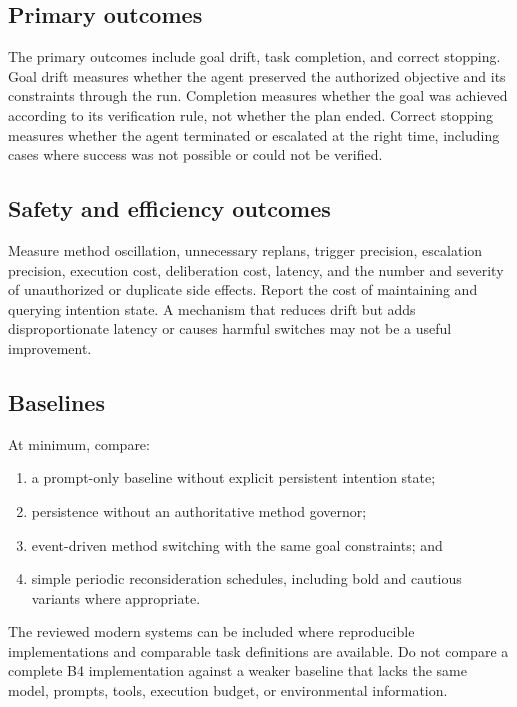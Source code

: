 \subsection{Primary outcomes}

The primary outcomes include goal drift, task completion, and correct stopping. Goal drift measures whether the agent preserved the authorized objective and its constraints through the run. Completion measures whether the goal was achieved according to its verification rule, not whether the plan ended. Correct stopping measures whether the agent terminated or escalated at the right time, including cases where success was not possible or could not be verified.

\subsection{Safety and efficiency outcomes}

Measure method oscillation, unnecessary replans, trigger precision, escalation precision, execution cost, deliberation cost, latency, and the number and severity of unauthorized or duplicate side effects. Report the cost of maintaining and querying intention state. A mechanism that reduces drift but adds disproportionate latency or causes harmful switches may not be a useful improvement.

\subsection{Baselines}

At minimum, compare:

\begin{enumerate}
  \item a prompt-only baseline without explicit persistent intention state;
  \item persistence without an authoritative method governor;
  \item event-driven method switching with the same goal constraints; and
  \item simple periodic reconsideration schedules, including bold and cautious variants where appropriate.
\end{enumerate}

The reviewed modern systems can be included where reproducible implementations and comparable task definitions are available. Do not compare a complete B4 implementation against a weaker baseline that lacks the same model, prompts, tools, execution budget, or environmental information.

